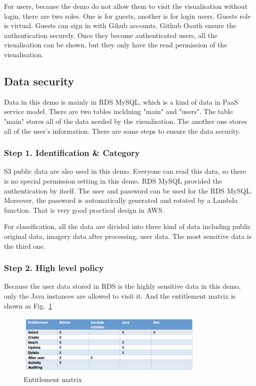 \documentclass[conference]{IEEEtran}
\begin{document}
For users, because the demo do not allow them to visit the visualisation without login, there are two roles. One is for guests, another is for login users. 
Guests role is virtual. Guests can sign in with Gihub accounts. Github Oauth ensure the authentication securely. Once they become authenticated users, 
all the visualisation can be shown, but they only have the read permission of the visualisation.

\subsection{Data security}

Data in this demo is mainly in RDS MySQL, which is a kind of data in PaaS service model. There are two tables inclduing "main" and "users". The table "main" 
stores all of the data needed by the visualisation. The another one stores all of the user's information. There are some steps to ensure the data security.

\subsubsection{Step 1. Identification \& Category}

S3 public data are also used in this demo. Everyone can read this data, so there is no special permission setting in this demo. RDS MySQL provided the authentication 
by itself. The user and password can be used for the RDS MySQL. Moreover, the password is automatically generated and rotated by a Lambda function. That is 
very good practical design in AWS.

For classification, all the data are divided into three kind of data including public original data, imagery data after processing, user data. The most sensitive 
data is the third one. 

\subsubsection{Step 2. High level policy}

Because the user data stored in RDS is the highly sensitive data in this demo, only the Java instances are allowed to visit it. And the entitlement matrix 
is shown as Fig.~\ref{matrix}

\begin{figure}[htbp]
    \centerline{\includegraphics[width=260pt]{images/matrix.png}}
    \caption{Entitlement matrix}
    \label{matrix}
\end{figure}
\end{document}
